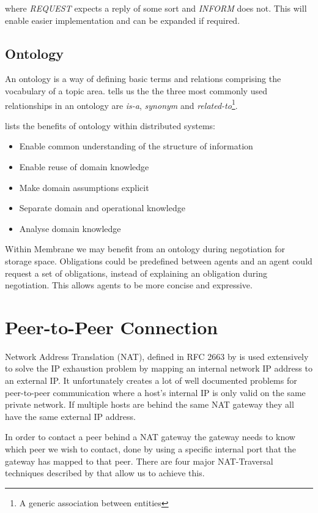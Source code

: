 \documentclass[11pt, a4paper, twoside]{report}
\begin{document}
where \emph{REQUEST} expects a reply of some sort and \emph{INFORM} does not. This will enable easier implementation and can be expanded if required.

\subsection{Ontology} \label{sec:ontology}

An ontology is a way of defining basic terms and relations comprising the vocabulary of a topic area. \cite{sugumaran2002ontologies} tells us the the three most commonly used relationships in an ontology are \emph{is-a}, \emph{synonym} and \emph{related-to}\footnote{A generic association between entities}. 

\cite{noy2001ontology} lists the benefits of ontology within distributed systems:

\begin{itemize}
 \item Enable common understanding of the structure of information
 \item Enable reuse of domain knowledge
 \item Make domain assumptions explicit
 \item Separate domain and operational knowledge
 \item Analyse domain knowledge
\end{itemize}

Within Membrane we may benefit from an ontology during negotiation for storage space. Obligations could be predefined between agents and an agent could request a set of obligations, instead of explaining an obligation during negotiation. This allows agents to be more concise and expressive.

\section{Peer-to-Peer Connection} \label{sec:p2pconn}

Network Address Translation (NAT), defined in RFC 2663 by \cite{srisuresh1999ip} is used extensively to solve the IP exhaustion problem by mapping an internal network IP address to an external IP. It unfortunately creates a lot of well documented problems for peer-to-peer communication where a host's internal IP is only valid on the same private network. If multiple hosts are behind the same NAT gateway they all have the same external IP address.

In order to contact a peer behind a NAT gateway the gateway needs to know which peer we wish to contact, done by using a specific internal port that the gateway has mapped to that peer. There are four major NAT-Traversal techniques described by \cite{ford2005peer} that allow us to achieve this.
\end{document}
